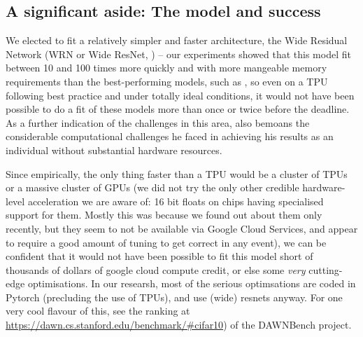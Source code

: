 \documentclass[10pt,twocolumn,letterpaper]{article}
\begin{document}
  \subsection{A significant aside: The model and success}
    We elected to fit a relatively simpler and faster architecture, the Wide Residual Network (WRN or Wide ResNet, \cite{Zagoruyko2016}) -- our experiments showed that this model fit between 10 and 100 times more quickly and with more mangeable memory requirements than the best-performing models, such as \cite{Yamada2018}, so even on a TPU following best practice and under totally ideal conditions, it would not have been possible to do a fit of these models more than once or twice before the deadline. As a further indication of the challenges in this area, \cite{Gastaldi2017} also bemoans the considerable computational challenges he faced in achieving his results as an individual without substantial hardware resources.

    Since empirically, the only thing faster than a TPU would be a cluster of TPUs or a massive cluster of GPUs (we did not try the only other credible hardware-level acceleration we are aware of: 16 bit floats on chips having specialised support for them. Mostly this was because we found out about them only recently, but they seem to not be available via Google Cloud Services, and appear to require a good amount of tuning to get correct in any event), we can be confident that it would not have been possible to fit this model short of thousands of dollars of google cloud compute credit, or else some \emph{very} cutting-edge optimisations. In our researsh, most of the serious optimsations are coded in Pytorch (precluding the use of TPUs), and use (wide) resnets anyway. For one very cool flavour of this, see the ranking at \url{https://dawn.cs.stanford.edu/benchmark/#cifar10}) of the \cite{Coleman2017} DAWNBench project.


\end{document}

